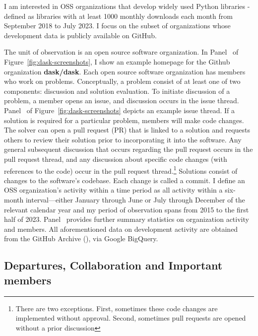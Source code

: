 \documentclass[12pt,notitlepage]{article}
\begin{document}
I am interested in OSS organizations that develop widely used Python libraries - defined as libraries with at least 1000 monthly downloads each month from September 2018 to July 2023. I focus on the subset of organizations whose development data is publicly available on GitHub. 

The unit of observation is an open source software organization. In Panel~ of Figure~\ref{fig:dask-screenshots}, I show an example homepage for the Github organization \textbf{dask/dask}. Each open source software organization has members who work on problems. Conceptually, a problem consist of at least one of two components: discussion and solution evaluation. To initiate discussion of a problem, a member opens an issue, and discussion occurs in the issue thread. Panel~ of Figure~\ref{fig:dask-screenshots} depicts an example issue thread. If a solution is required for a particular problem, members will make code changes. The solver can open a pull request (PR) that is linked to a solution and requests others to review their solution prior to incorporating it into the software. Any general subsequent discussion that occurs regarding the pull request occurs in the pull request thread, and any discussion about specific code changes (with references to the code) occur in the pull request thread.\footnote{There are two exceptions. First, sometimes these code changes are implemented without approval. Second, sometimes pull requests are opened without a prior discussion} Solutions consist of changes to the software's codebase. Each change is called a commit. I define an OSS organization’s activity within a time period as all activity within a six-month interval—either January through June or July through December of the relevant calendar year and my period of observation spans from 2015 to the first half of 2023. Panel~ provides further summary statistics on organization activity and members. All aforementioned data on development activity are obtained from the GitHub Archive (\cite{github_archive_github_2025}), via Google BigQuery.


\subsection{Departures, Collaboration and Important members}
\end{document}
